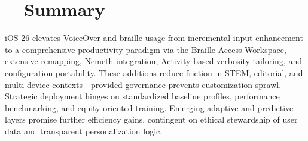 \section{~~Summary}
\label{sec:sr30-summary}
iOS 26 elevates VoiceOver and braille usage from incremental input enhancement to a comprehensive productivity paradigm via the Braille Access Workspace, extensive remapping, Nemeth integration, Activity-based verbosity tailoring, and configuration portability. These additions reduce friction in STEM, editorial, and multi-device contexts—provided governance prevents customization sprawl. Strategic deployment hinges on standardized baseline profiles, performance benchmarking, and equity-oriented training. Emerging adaptive and predictive layers promise further efficiency gains, contingent on ethical stewardship of user data and transparent personalization logic.

